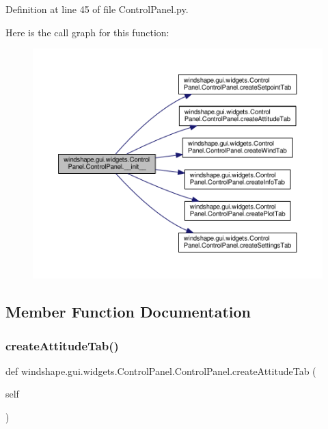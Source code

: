 Definition at line 45 of file Control\+Panel.\+py.

Here is the call graph for this function\+:\nopagebreak
\begin{figure}[H]
\begin{center}
\leavevmode
\includegraphics[width=350pt]{classwindshape_1_1gui_1_1widgets_1_1_control_panel_1_1_control_panel_aa35623692da665ef07969e15b98f158e_cgraph}
\end{center}
\end{figure}


\subsection{Member Function Documentation}
\mbox{\label{classwindshape_1_1gui_1_1widgets_1_1_control_panel_1_1_control_panel_a60f1e1548d1f79aac6f474c0beaabbfa}} 
\subsubsection{\texorpdfstring{create\+Attitude\+Tab()}{createAttitudeTab()}}
{\footnotesize\ttfamily def windshape.\+gui.\+widgets.\+Control\+Panel.\+Control\+Panel.\+create\+Attitude\+Tab (\begin{DoxyParamCaption}\item[{}]{self }\end{DoxyParamCaption})}

